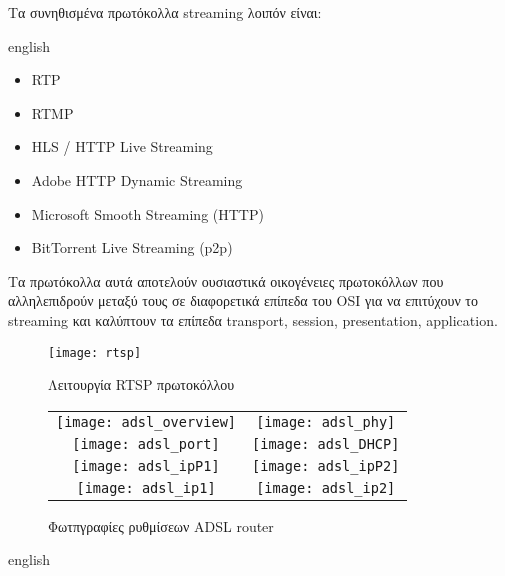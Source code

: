 \documentclass[a4paper,10pt]{article}
\begin{document}
Τα συνηθισμένα πρωτόκολλα \foreignlanguage{english}{streaming} λοιπόν είναι:
\begin{otherlanguage*}{english}
	\begin{itemize}
		\item RTP
		\item RTMP
		\item HLS / HTTP Live Streaming
		\item Adobe HTTP Dynamic Streaming
		\item Microsoft Smooth Streaming (HTTP)
		\item BitTorrent Live Streaming (p2p)
	\end{itemize}
\end{otherlanguage*}
Τα πρωτόκολλα αυτά αποτελούν ουσιαστικά οικογένειες πρωτοκόλλων που αλληλεπιδρούν μεταξύ τους σε διαφορετικά επίπεδα του \foreignlanguage{english}{OSI} για να επιτύχουν το \foreignlanguage{english}{streaming} και καλύπτουν τα επίπεδα \foreignlanguage{english}{transport, session, presentation, application}.

\begin{figure}
  \texttt{[image: rtsp]}
	\caption{Λειτουργία RTSP πρωτοκόλλου \cite{streamppt}}
\end{figure}


\begin{figure}
	\centering
	\begin{tabular}{c c}
		\texttt{[image: adsl\_overview]} & \texttt{[image: adsl\_phy]}\\
		\texttt{[image: adsl\_port]} & \texttt{[image: adsl\_DHCP]}\\
		\texttt{[image: adsl\_ipP1]} & \texttt{[image: adsl\_ipP2]}\\
		\texttt{[image: adsl\_ip1]} & \texttt{[image: adsl\_ip2]}
	\end{tabular}
	\caption{Φωτπγραφίες ρυθμίσεων \foreignlanguage{english}{ADSL router}}
\end{figure}


\begin{otherlanguage*}{english}
	\printbibliography
\end{otherlanguage*}
\end{document}
